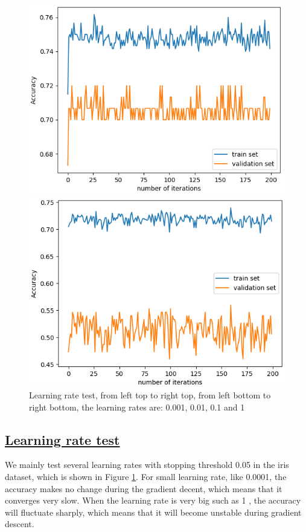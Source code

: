\documentclass[11pt]{scrartcl}
\begin{document}
\begin{figure}[H]
\begin{minipage}{0.8\linewidth}
\begin{minipage}[b]{0.48\linewidth}
			\includegraphics[width= \linewidth]{fig/iris-lr-01.png}
		  \end{minipage}
		  \hfill
		  \begin{minipage}[b]{0.48\linewidth}
			\centering			
			\includegraphics[width= \linewidth]{fig/iris-lr-1.png}
		  \end{minipage}
	\end{minipage}
	\caption{Learning rate test, from left top to right top, from left bottom to right bottom, the learning rates are: 0.001, 0.01, 0.1 and 1}
	\label{lr_test}
\end{figure}

\subsection*{\underline{Learning rate test}}
We mainly test several learning rates with stopping threshold 0.05 in the iris dataset, which is shown in Figure \ref{lr_test}. For small learning rate, like 0.0001, the accuracy makes no change during the gradient decent, which means that it converges very slow. When the learning rate is very big such as 1 , the accuracy will fluctuate sharply, which means that it will become unstable during gradient descent. 
\end{document}
